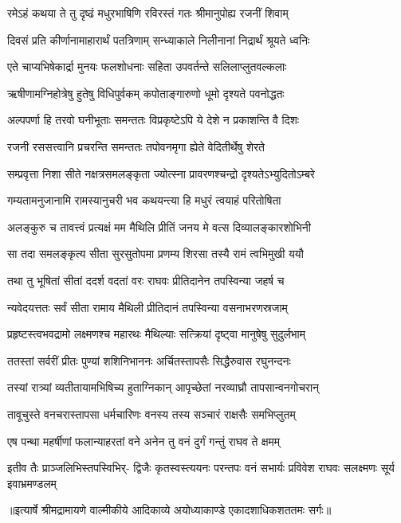 \twolineshloka
{रमेऽहं कथया ते तु दृष्ढं मधुरभाषिणि}
{रविरस्तं गतः श्रीमानुपोह्य रजनीं शिवाम्} %

\twolineshloka
{दिवसं प्रति कीर्णानामाहारार्थं पतत्रिणाम्}
{सन्ध्याकाले निलीनानां निद्रार्थं श्रूयते ध्वनिः} %

\twolineshloka
{एते चाप्यभिषेकार्द्रा मुनयः फलशोधनाः}
{सहिता उपवर्तन्ते सलिलाप्लुतवल्कलाः} %

\twolineshloka
{ऋषीणामग्निहोत्रेषु हुतेषु विधिपुर्वकम्}
{कपोताङ्गारुणो धूमो दृश्यते पवनोद्धतः} %

\twolineshloka
{अल्पपर्णा हि तरवो घनीभूताः समन्ततः}
{विप्रकृष्टेऽपि ये देशे न प्रकाशन्ति वै दिशः} %

\twolineshloka
{रजनी रससत्त्वानि प्रचरन्ति समन्ततः}
{तपोवनमृगा ह्येते वेदितीर्थेषु शेरते} %

\twolineshloka
{सम्प्रवृत्ता निशा सीते नक्षत्रसमलङ्कृता}
{ज्योत्स्ना प्रावरणश्चन्द्रो दृश्यतेऽभ्युदितोऽम्बरे} %

\twolineshloka
{गम्यतामनुजानामि रामस्यानुचरी भव}
{कथयन्त्या हि मधुरं त्वयाहं परितोषिता} %

\twolineshloka
{अलङ्कुरु च तावत्त्वं प्रत्यक्षं मम मैथिलि}
{प्रीतिं जनय मे वत्स दिव्यालङ्कारशोभिनी} %

\twolineshloka
{सा तदा समलङ्कृत्य सीता सुरसुतोपमा}
{प्रणम्य शिरसा तस्यै रामं त्वभिमुखी ययौ} %

\twolineshloka
{तथा तु भूषितां सीतां ददर्श वदतां वरः}
{राघवः प्रीतिदानेन तपस्विन्या जहर्ष च} %

\twolineshloka
{न्यवेदयत्ततः सर्वं सीता रामाय मैथिली}
{प्रीतिदानं तपस्विन्या वसनाभरणस्रजाम्} %

\twolineshloka
{प्रहृष्टस्त्वभवद्रामो लक्ष्मणश्च महारथः}
{मैथिल्याः सत्क्रियां दृष्ट्वा मानुषेषु सुदुर्लभाम्} %

\twolineshloka
{ततस्तां सर्वरीं प्रीतः पुण्यां शशिनिभाननः}
{अर्चितस्तापसैः सिद्धैरुवास रघुनन्दनः} %

\twolineshloka
{तस्यां रात्र्यां व्यतीतायामभिषिच्य हुताग्निकान्}
{आपृच्छेतां नरव्याघ्रौ तापसान्वनगोचरान्} %

\twolineshloka
{तावूचुस्ते वनचरास्तापसा धर्मचारिणः}
{वनस्य तस्य सञ्चारं राक्षसैः समभिप्लुतम्} %

\twolineshloka
{एष पन्था महर्षीणां फलान्याहरतां वने}
{अनेन तु वनं दुर्गं गन्तुं राघव ते क्षमम्} %

\fourlineindentedshloka
{इतीव तैः प्राञ्जलिभिस्तपस्विभिर्-}
{द्विजैः कृतस्वस्त्ययनः परन्तपः}
{वनं सभार्यः प्रविवेश राघवः}
{सलक्ष्मणः सूर्य इवाभ्रमण्डलम्} %


{॥इत्यार्षे श्रीमद्रामायणे वाल्मीकीये आदिकाव्ये अयोध्याकाण्डे एकादशाधिकशततमः सर्गः॥}


